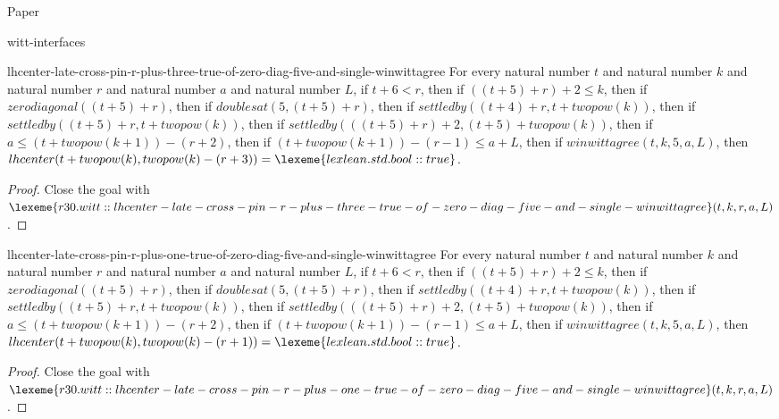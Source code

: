 \begin{lexlean}{Paper}
\begin{section}{witt-interfaces}
  \begin{theorem}{lhcenter-late-cross-pin-r-plus-three-true-of-zero-diag-five-and-single-winwittagree}
  For every natural number \(t\) and natural number \(k\) and natural number \(r\) and natural number \(a\) and natural number \(L\), if \(t + 6 < r\), then if \(((t + 5) + r) + 2 ≤ k\), then if \(zerodiagonal((t + 5) + r)\), then if \(doublesat(5, (t + 5) + r)\), then if \(settledby((t + 4) + r, t + twopow(k))\), then if \(settledby((t + 5) + r, t + twopow(k))\), then if \(settledby(((t + 5) + r) + 2, (t + 5) + twopow(k))\), then if \(a ≤ (t + twopow(k + 1)) - (r + 2)\), then if \((t + twopow(k + 1)) - (r - 1) ≤ a + L\), then if \(winwittagree(t, k, 5, a, L)\), then \(lhcenter(t + twopow(k), twopow(k) - (r + 3)) = \lexeme{lexlean.std.bool::true}\).
  \begin{proof}
  Close the goal with \(\lexeme{r30.witt::lhcenter-late-cross-pin-r-plus-three-true-of-zero-diag-five-and-single-winwittagree}(t, k, r, a, L)\).
  \end{proof}
  \end{theorem}

  \begin{theorem}{lhcenter-late-cross-pin-r-plus-one-true-of-zero-diag-five-and-single-winwittagree}
  For every natural number \(t\) and natural number \(k\) and natural number \(r\) and natural number \(a\) and natural number \(L\), if \(t + 6 < r\), then if \(((t + 5) + r) + 2 ≤ k\), then if \(zerodiagonal((t + 5) + r)\), then if \(doublesat(5, (t + 5) + r)\), then if \(settledby((t + 4) + r, t + twopow(k))\), then if \(settledby((t + 5) + r, t + twopow(k))\), then if \(settledby(((t + 5) + r) + 2, (t + 5) + twopow(k))\), then if \(a ≤ (t + twopow(k + 1)) - (r + 2)\), then if \((t + twopow(k + 1)) - (r - 1) ≤ a + L\), then if \(winwittagree(t, k, 5, a, L)\), then \(lhcenter(t + twopow(k), twopow(k) - (r + 1)) = \lexeme{lexlean.std.bool::true}\).
  \begin{proof}
  Close the goal with \(\lexeme{r30.witt::lhcenter-late-cross-pin-r-plus-one-true-of-zero-diag-five-and-single-winwittagree}(t, k, r, a, L)\).
  \end{proof}
  \end{theorem}


\end{section}
\end{lexlean}
